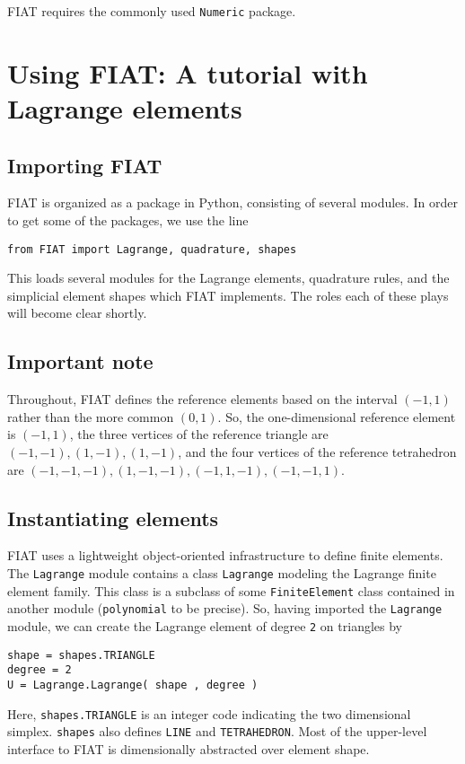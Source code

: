 \documentclass{fenicsmanual}
\begin{document}
FIAT requires the commonly used \verb.Numeric. package.


\chapter{Using FIAT: A tutorial with Lagrange elements}
\section{Importing FIAT}
FIAT is organized as a package in Python, consisting of several
modules.  In order to get some of the packages, we use the line
\begin{verbatim}
from FIAT import Lagrange, quadrature, shapes
\end{verbatim}
This loads several modules for the Lagrange elements, quadrature
rules, and the simplicial element shapes which FIAT implements.  The
roles each of these plays will become clear shortly.

\section{Important note}
Throughout, FIAT defines the reference elements based on the interval
$(-1,1)$ rather than the more common $(0,1)$.  So, the one-dimensional
reference element is $(-1,1)$, the three vertices of the reference
triangle are $(-1,-1),(1,-1),(1,-1)$, and the four vertices of the
reference tetrahedron are $(-1,-1,-1),(1,-1,-1),(-1,1,-1),(-1,-1,1)$.

\section{Instantiating elements}
FIAT uses a lightweight object-oriented infrastructure to define
finite elements.  The \verb.Lagrange. module contains a class
\verb.Lagrange. modeling the Lagrange finite element family.  This
class is a subclass of some \verb.FiniteElement. class contained in
another module (\verb.polynomial. to be precise).  So, having imported
the \verb.Lagrange. module, we can create the Lagrange element of
degree \verb.2. on triangles by
\begin{verbatim}
shape = shapes.TRIANGLE
degree = 2
U = Lagrange.Lagrange( shape , degree )
\end{verbatim}
Here, \verb/shapes.TRIANGLE/ is an integer code indicating the two
dimensional simplex.  \verb.shapes. also defines
\verb.LINE. and \verb.TETRAHEDRON..  Most of the
upper-level interface to FIAT is dimensionally abstracted over element
shape.
\end{document}
